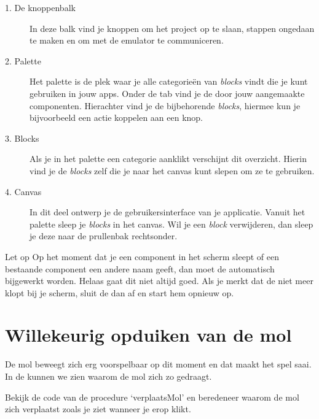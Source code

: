 \begin{description}
  \item[1. De knoppenbalk] In deze balk vind je knoppen om het project op te slaan, stappen ongedaan te maken en om met de emulator te communiceren.
  \item[2. Palette] Het palette is de plek waar je alle categorie\"en van \emph{blocks} vindt die je kunt gebruiken in jouw apps. Onder de tab  vind je de door jouw aangemaakte componenten. Hierachter vind je de bijbehorende \emph{blocks}, hiermee kun je bijvoorbeeld een actie koppelen aan een knop.
  \item[3. Blocks] Als je in het palette een categorie aanklikt verschijnt dit overzicht. Hierin vind je de \emph{blocks} zelf die je naar het canvas kunt slepen om ze te gebruiken.
  \item[4. Canvas] In dit deel ontwerp je de gebruikersinterface van je applicatie. Vanuit het palette sleep je \emph{blocks} in het canvas. Wil je een \emph{block} verwijderen, dan sleep je deze naar de prullenbak rechtsonder.
\end{description}

\begin{derivation}{Let op}
Op het moment dat je een component in het  scherm sleept of een bestaande component een andere naam geeft, dan moet de  automatisch bijgewerkt worden. Helaas gaat dit niet altijd goed. Als je merkt dat de  niet meer klopt bij je  scherm, sluit de  dan af en start hem opnieuw op.
\end{derivation}


\section{Willekeurig opduiken van de mol}
De mol beweegt zich erg voorspelbaar op dit moment en dat maakt het spel saai. In de  kunnen we zien waarom de mol zich zo gedraagt.

\begin{opgave}
    \opgVraag
	Bekijk de code van de procedure `verplaatsMol' en beredeneer waarom de mol zich verplaatst 
	zoals je ziet wanneer je erop klikt. 
\end{opgave}

